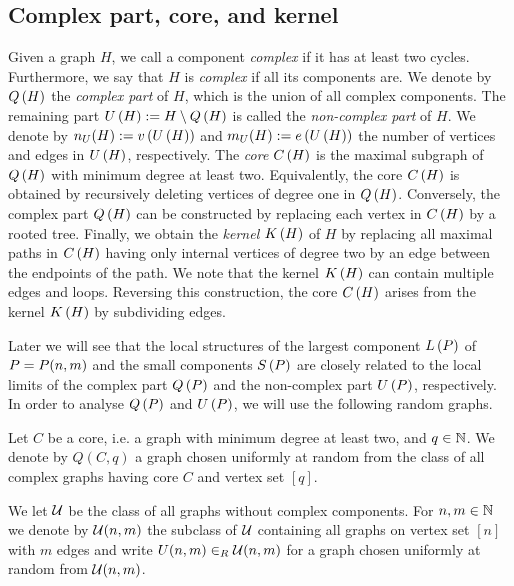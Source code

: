 \subsection{Complex part, core, and kernel}\label{LSsub:decomposition}
Given a graph $H$, we call a component {\em complex} if it has at least two cycles. Furthermore, we say that $H$ is {\em complex} if all its components are. We denote by $Q\left(H\right)$ the {\em complex part} of $H$, which is the union of all complex components. The remaining part $U\left(H\right):=H\setminus Q\left(H\right)$ is called the {\em non-complex part} of $H$. We denote by $n_U(H):=v\left({U\left(H\right)}\right)$ and $m_U(H):=e\left({U\left(H\right)}\right)$ the number of vertices and edges in $U\left(H\right)$, respectively. The {\em core} $C\left(H\right)$ is the maximal subgraph of $Q\left(H\right)$ with minimum degree at least two. Equivalently, the core $C\left(H\right)$ is obtained by recursively deleting vertices of degree one in $Q\left(H\right)$. Conversely, the complex part $Q\left(H\right)$ can be constructed by replacing each vertex in $C\left(H\right)$ by a rooted tree. Finally, we obtain the {\em kernel} $K\left(H\right)$ of $H$ by replacing all maximal paths in $C\left(H\right)$ having only internal vertices of degree two by an edge between the endpoints of the path. We note that the kernel $K\left(H\right)$ can contain multiple edges and loops. Reversing this construction, the core $C\left(H\right)$ arises from the kernel $K\left(H\right)$ by subdividing edges.

Later we will see that the local structures of the largest component $L\left(P\right)$ of $P=P(n,m)$ and the small components $S\left(P\right)$ are closely related to the local limits of the complex part $Q\left(P\right)$ and the non-complex part $U\left(P\right)$, respectively. In order to analyse $Q\left(P\right)$ and $U\left(P\right)$, we will use the following random graphs.

\begin{definition}\label{LSdef:random_complex}
	Let $C$ be a core, i.e. a graph with minimum degree at least two, and $q\in\mathbb{N}$. We denote by $Q(C,q)$ a graph chosen uniformly at random from the class of all complex graphs having core $C$ and vertex set $[q]$.
\end{definition}

\begin{definition}\label{LSdef:random_non_complex}
	We let $\mathcal{U}$ be the class of all graphs without complex components. For $n,m\in\mathbb{N}$ we denote by $\mathcal{U}(n,m)$ the subclass of $\mathcal{U}$ containing all graphs on vertex set $[n]$ with $m$ edges and write $U(n,m)\in_R \mathcal{U}(n,m)$ for a graph chosen uniformly at random from $\mathcal{U}(n,m)$.
\end{definition}


